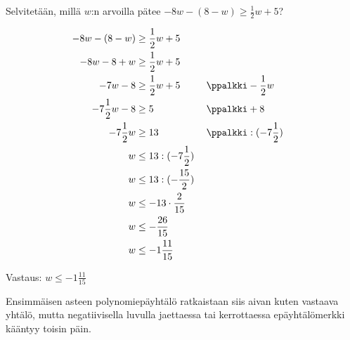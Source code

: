 \begin{esimerkki}Selvitetään, millä $w$:n arvoilla pätee
$-8w-(8-w) \geq \frac12 w+5$?

\begin{align*}
-8w-(8-w) &\geq \frac12 w+5 \\
-8w-8+w &\geq \frac12 w+5 \\
-7w-8 &\geq \frac12 w+5  \ \ \ \ \ && \ppalkki -\frac12 w \\
-7\frac12 w-8 &\geq 5  \ \ \ \ \ && \ppalkki +8 \\
-7\frac12 w &\geq 13  \ \ \ \ \ && \ppalkki :(-7\frac12) \\
w &\leq 13:(-7\frac12) \\
w &\leq 13:(-\frac{15}{2}) \\
w &\leq -13\cdot \frac{2}{15} \\
w &\leq -\frac{26}{15} \\
w &\leq -1\frac{11}{15}
\end{align*}

Vastaus: $w \leq -1\frac{11}{15}$
\end{esimerkki}

Ensimmäisen asteen polynomiepäyhtälö ratkaistaan siis aivan kuten vastaava yhtälö, mutta negatiivisella luvulla jaettaessa tai kerrottaessa epäyhtälömerkki kääntyy toisin päin.

